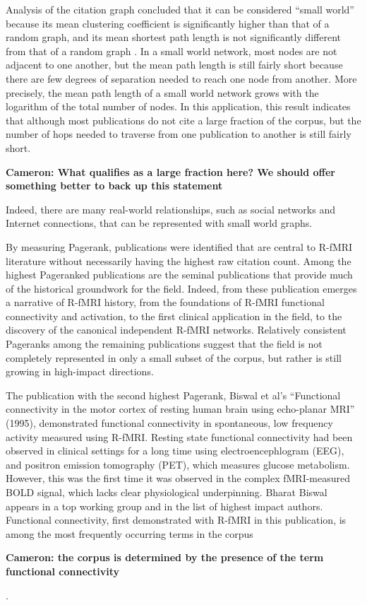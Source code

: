 \documentclass[12pt,5p]{elsarticle}
\newcommand\MyCBox[1]{%
  \colorbox{yellow!60}{\begin{varwidth}{\dimexpr\linewidth-2\fboxsep}#1\end{varwidth}}}
\newcommand{\COMMENTCC}[1]{\MyCBox{\textcolor{cc_commentcolor}{\textbf{Cameron:
#1}}}}
\begin{document}
Analysis of the citation graph concluded that it can be considered ``small
world'' because its mean clustering coefficient is significantly higher
than that of a random graph, and its mean shortest path length is not
significantly different from that of a random graph \cite{Watts1998}. In a
small world network, most nodes are not adjacent to one another, but the
mean path length is still fairly short because there are few degrees of
separation needed to reach one node from another. More precisely, the mean
path length of a small world network grows with the logarithm of the total
number of nodes. In this application, this result indicates that although
most publications do not cite a large fraction of the corpus, but the
number of hops needed to traverse from one publication to another is still
fairly short. \COMMENTCC{What qualifies as a large fraction here? We
should offer something better to back up this statement} Indeed, there are
many real-world relationships, such as social networks and Internet
connections, that can be represented with small world graphs. 

By measuring Pagerank, publications were identified that are central to
R-fMRI literature without necessarily having the highest raw citation
count. Among the highest Pageranked publications are the seminal
publications that provide much of the historical groundwork for the field.
Indeed, from these publication emerges a narrative of R-fMRI history, from
the foundations of R-fMRI functional connectivity and activation, to the
first clinical application in the field, to the discovery of the canonical
independent R-fMRI networks.  Relatively consistent Pageranks among the
remaining publications suggest that the field is not completely
represented in only a small subset of the corpus, but rather is still
growing in high-impact directions. 

The publication with the second highest Pagerank, Biswal et al’s
``Functional connectivity in the motor cortex of resting human brain using
echo-planar MRI'' (1995)\cite{Biswal1995}, demonstrated functional
connectivity in spontaneous, low frequency activity measured using R-fMRI.
Resting state functional connectivity had been observed in clinical
settings for a long time using electroencephlogram (EEG), and positron
emission tomography (PET), which measures glucose metabolism. However,
this was the first time it was observed in the complex fMRI-measured BOLD
signal, which lacks clear physiological underpinning. Bharat Biswal
appears in a top working group and in the list of highest impact authors.
Functional connectivity, first demonstrated with R-fMRI in this
publication, is among the most frequently occurring terms in the corpus
\COMMENTCC{the corpus is determined by the presence of the term functional
connectivity}. 
\end{document}
